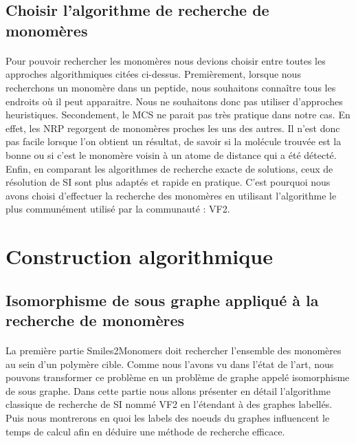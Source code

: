 \documentclass[12pt,french,twoside]{report}
\begin{document}
\subsection{Choisir l'algorithme de recherche de monomères}

\paragraph{}Pour pouvoir rechercher les monomères nous devions choisir entre toutes les approches algorithmiques citées ci-dessus.
Premièrement, lorsque nous recherchons un monomère dans un peptide, nous souhaitons connaître tous les endroits où il peut apparaitre.
Nous ne souhaitons donc pas utiliser d'approches heuristiques.
Secondement, le MCS ne parait pas très pratique dans notre cas.
En effet, les NRP regorgent de monomères proches les uns des autres.
Il n'est donc pas facile lorsque l'on obtient un résultat, de savoir si la molécule trouvée est la bonne ou si c'est le monomère voisin à un atome de distance qui a été détecté.
Enfin, en comparant les algorithmes de recherche exacte de solutions, ceux de résolution de SI sont plus adaptés et rapide en pratique.
C'est pourquoi nous avons choisi d'effectuer la recherche des monomères en utilisant l'algorithme le plus communément utilisé par la communauté : VF2.




\section{Construction algorithmique}

\subsection{Isomorphisme de sous graphe appliqué à la recherche de monomères}

\label{isomorphisme_p}

\paragraph{}La première partie Smiles2Monomers doit rechercher l'ensemble des monomères au sein d'un polymère cible.
Comme nous l'avons vu dans l'état de l'art, nous pouvons transformer ce problème en un problème de graphe appelé isomorphisme de sous graphe.
Dans cette partie nous allons présenter en détail l'algorithme classique de recherche de SI nommé VF2 en l'étendant à des graphes labellés.
Puis nous montrerons en quoi les labels des noeuds du graphes influencent le temps de calcul afin en déduire une méthode de recherche efficace.
\end{document}
